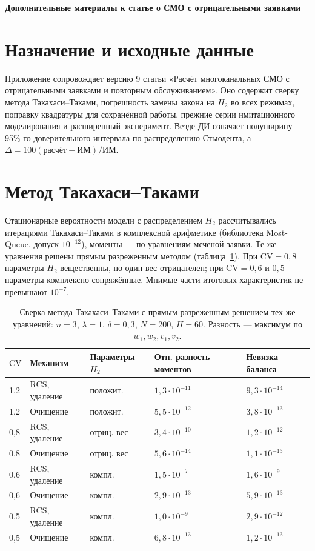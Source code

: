 \documentclass[a4paper,12pt]{article}
\begin{document}
\begin{center}\Large\bfseries Дополнительные материалы к статье о СМО с отрицательными заявками\end{center}
\section{Назначение и исходные данные}
Приложение сопровождает версию 9 статьи «Расчёт многоканальных СМО с отрицательными заявками и повторным обслуживанием». Оно содержит сверку метода Такахаси--Таками, погрешность замены закона на \(H_2\) во всех режимах, поправку квадратуры для сохранённой работы, прежние серии имитационного моделирования и расширенный эксперимент. Везде ДИ означает полуширину 95\%-го доверительного интервала по распределению Стьюдента, а \(\Delta=100(\text{расчёт}-\text{ИМ})/\text{ИМ}\).

\section{Метод Такахаси--Таками}
Стационарные вероятности модели с распределением \(H_2\) рассчитывались итерациями Такахаси--Таками в комплексной арифметике (библиотека Most-Queue, допуск \(10^{-12}\)), моменты --- по уравнениям меченой заявки. Те же уравнения решены прямым разреженным методом (таблица~\ref{tab:ttcheck}). При \(\mathrm{CV}=0{,}8\) параметры \(H_2\) вещественны, но один вес отрицателен; при \(\mathrm{CV}=0{,}6\) и \(0{,}5\) параметры комплексно-сопряжённые. Мнимые части итоговых характеристик не превышают \(10^{-7}\).

\begin{table}[!htbp]
\centering\small\setlength{\tabcolsep}{2pt}
\begin{tabular}{@{}p{1.2cm}p{4.2cm}p{2.6cm}p{3.6cm}p{3.6cm}@{}}
\toprule
$\mathrm{CV}$ & Механизм & Параметры $H_2$ & Отн. разность моментов & Невязка баланса \\
\midrule
1,2 & RCS, удаление & положит. & \(1{,}3\cdot10^{-11}\) & \(9{,}3\cdot10^{-14}\) \\
1,2 & Очищение & положит. & \(5{,}5\cdot10^{-12}\) & \(3{,}8\cdot10^{-13}\) \\
0,8 & RCS, удаление & отриц. вес & \(3{,}4\cdot10^{-10}\) & \(1{,}2\cdot10^{-12}\) \\
0,8 & Очищение & отриц. вес & \(5{,}6\cdot10^{-14}\) & \(1{,}1\cdot10^{-13}\) \\
0,6 & RCS, удаление & компл. & \(1{,}5\cdot10^{-7}\) & \(1{,}6\cdot10^{-9}\) \\
0,6 & Очищение & компл. & \(2{,}9\cdot10^{-13}\) & \(5{,}9\cdot10^{-13}\) \\
0,5 & RCS, удаление & компл. & \(1{,}0\cdot10^{-9}\) & \(2{,}9\cdot10^{-12}\) \\
0,5 & Очищение & компл. & \(6{,}8\cdot10^{-13}\) & \(1{,}2\cdot10^{-13}\) \\
\bottomrule
\end{tabular}
\caption{Сверка метода Такахаси--Таками с прямым разреженным решением тех же уравнений: \(n=3\), \(\lambda=1\), \(\delta=0{,}3\), \(N=200\), \(H=60\). Разность --- максимум по \(w_1,w_2,v_1,v_2\).}
\label{tab:ttcheck}
\end{table}
\end{document}
